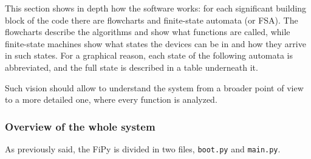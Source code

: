 			

			This section shows in depth how the software works: for each significant building block of the code there are flowcharts and finite-state automata (or FSA).
			The flowcharts describe the algorithms and show what functions are called, while finite-state machines show what states the devices can be in and how they arrive in such states.
			For a graphical reason, each state of the following automata is abbreviated, and the full state is described in a table underneath it.
			
			Such vision should allow to understand the system from a broader point of view to a more detailed one, where every function is analyzed.
			
			\subsubsection{Overview of the whole system}
			
				As previously said, the FiPy is divided in two files, \texttt{boot.py} and \texttt{main.py}.
				
